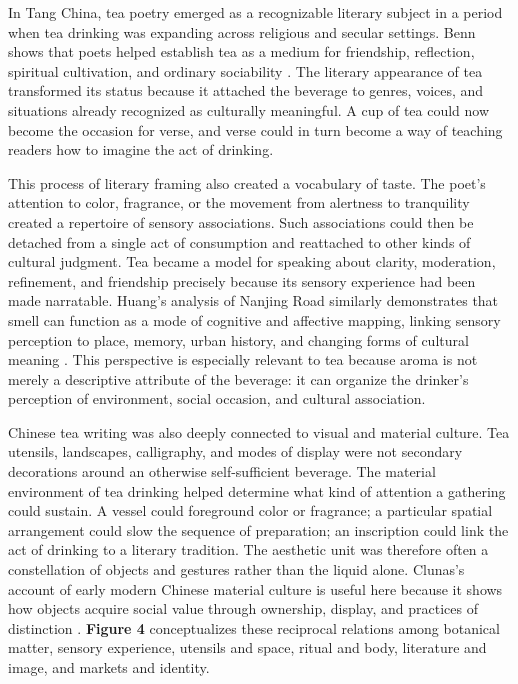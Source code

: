 \documentclass[numbers]{IntechOpen-Book}
\begin{document}
In Tang China, tea poetry emerged as a recognizable literary subject in a period when tea drinking was expanding across religious and secular settings. Benn shows that poets helped establish tea as a medium for friendship, reflection, spiritual cultivation, and ordinary sociability \cite{bennpoetry}. The literary appearance of tea transformed its status because it attached the beverage to genres, voices, and situations already recognized as culturally meaningful. A cup of tea could now become the occasion for verse, and verse could in turn become a way of teaching readers how to imagine the act of drinking.

This process of literary framing also created a vocabulary of taste. The poet's attention to color, fragrance, or the movement from alertness to tranquility created a repertoire of sensory associations. Such associations could then be detached from a single act of consumption and reattached to other kinds of cultural judgment. Tea became a model for speaking about clarity, moderation, refinement, and friendship precisely because its sensory experience had been made narratable. Huang's analysis of Nanjing Road similarly demonstrates that smell can function as a mode of cognitive and affective mapping, linking sensory perception to place, memory, urban history, and changing forms of cultural meaning \cite{huang}. This perspective is especially relevant to tea because aroma is not merely a descriptive attribute of the beverage: it can organize the drinker's perception of environment, social occasion, and cultural association.

Chinese tea writing was also deeply connected to visual and material culture. Tea utensils, landscapes, calligraphy, and modes of display were not secondary decorations around an otherwise self-sufficient beverage. The material environment of tea drinking helped determine what kind of attention a gathering could sustain. A vessel could foreground color or fragrance; a particular spatial arrangement could slow the sequence of preparation; an inscription could link the act of drinking to a literary tradition. The aesthetic unit was therefore often a constellation of objects and gestures rather than the liquid alone. Clunas's account of early modern Chinese material culture is useful here because it shows how objects acquire social value through ownership, display, and practices of distinction \cite{clunas}. \textbf{Figure 4} conceptualizes these reciprocal relations among botanical matter, sensory experience, utensils and space, ritual and body, literature and image, and markets and identity.
\end{document}
